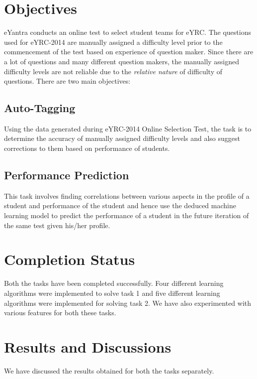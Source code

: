 \documentclass[12pt]{article}
\begin{document}
	
	\section{Objectives}
	eYantra conducts an online test to select student teams for eYRC. 
	The questions used for eYRC-2014 are manually assigned
	a difficulty level prior to the commencement of the test based on
	experience of question maker. Since there are a lot of questions
	and many different question makers, the manually assigned difficulty
	levels are not reliable due to the \textit{relative nature} of
	difficulty of questions.\newline
	There are two main objectives:
	
	\subsection{Auto-Tagging}
	Using the data generated during eYRC-2014 Online Selection Test, the
	task is to determine the accuracy of manually assigned difficulty
	levels and also suggest corrections to them based on performance
	of students. 
	
	\subsection{Performance Prediction}
	This task involves finding correlations between various aspects in the
	profile of a student and performance of the student and hence use the
	deduced machine learning model to predict the performance of a student
	in the future iteration of the same test given his/her profile.\newline	
	
	
	\section{Completion Status}
	Both the tasks have been completed successfully. Four different learning
	algorithms were implemented to solve task 1 and five different learning
	algorithms were implemented for solving task 2. We have also experimented
	with various features for both these tasks.
	
	
	\section{Results and Discussions}
	We have discussed the results obtained for both the tasks separately.
	
\end{document}
